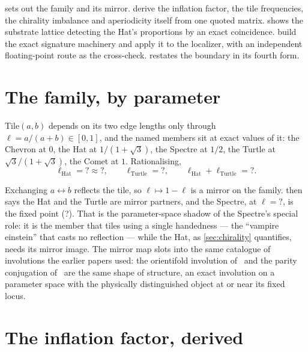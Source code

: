 \documentclass[11pt,a4paper]{article}
\newcommand{\MTHatEll}{?}\newcommand{\MTTurtleEll}{?}
\newcommand{\MTSpectreEll}{?}\newcommand{\MTHatPlusTurtle}{?}
\newcommand{\MTSpectreFixed}{?}\newcommand{\MTHatEllFloat}{?}
\theoremstyle{definition}
\begin{document}
 sets out the family and its mirror.
 derive the inflation factor, the tile
frequencies, the chirality imbalance and aperiodicity itself from one
quoted matrix.  shows the substrate lattice detecting
the Hat's proportions by an exact coincidence.
 build the exact signature machinery and
apply it to the localizer, with an independent floating-point route as the
cross-check.  restates the boundary in its fourth form.


\section{The family, by parameter}
\label{sec:family}

Tile$(a,b)$ depends on its two edge lengths only through
$\ell = a/(a+b) \in [0,1]$, and the named members sit at exact values of it:
the Chevron at $0$, the Hat at $1/(1+\sqrt3)$, the Spectre at $1/2$, the
Turtle at $\sqrt3/(1+\sqrt3)$, the Comet at $1$. Rationalising,
%
\begin{equation}
\ell_{\mathrm{Hat}} = \MTHatEll \approx \MTHatEllFloat ,
\qquad
\ell_{\mathrm{Turtle}} = \MTTurtleEll ,
\qquad
\ell_{\mathrm{Hat}} + \ell_{\mathrm{Turtle}} = \MTHatPlusTurtle .
\label{eq:ells}
\end{equation}

Exchanging $a \leftrightarrow b$ reflects the tile, so
$\ell \mapsto 1 - \ell$ is a mirror on the family.  then says
the Hat and the Turtle are mirror partners, and the Spectre, at
$\ell = \MTSpectreEll$, is the fixed point (\MTSpectreFixed). That is the
parameter-space shadow of the Spectre's special role: it is the member that
tiles using a single handedness --- the ``vampire einstein'' that casts no
reflection --- while the Hat, as \cref{sec:chirality} quantifies, needs its
mirror image. The mirror map slots into the same catalogue of
involutions the earlier papers used: the orientifold involution
of~\cite{SuppStrings} and the parity conjugation of~\cite{SuppTwistor} are
the same shape of structure, an exact involution on a parameter space with
the physically distinguished object at or near its fixed locus.


\section{The inflation factor, derived}
\label{sec:inflation}
\end{document}

